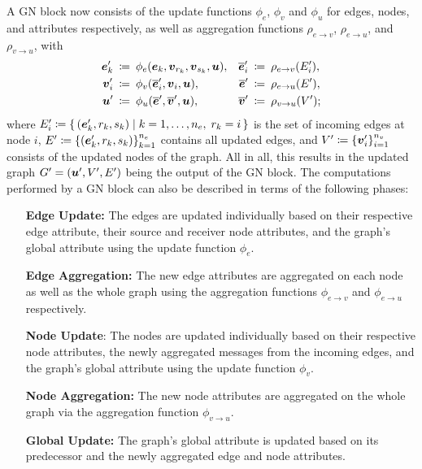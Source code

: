 A GN block now consists of the update functions $\phi_e$, $\phi_v$ and $\phi_u$ for edges,
nodes, and attributes respectively, as well as aggregation functions $\rho_{e \to v}$,
$\rho_{e \to u}$, and $\rho_{v \to u}$, with
\begin{align*}
    \boldsymbol{e}_k' \: &\coloneqq \: \phi_e(\boldsymbol{e}_k, \boldsymbol{v}_{r_k}, \boldsymbol{v}_{s_k}, \boldsymbol{u}), 
    &\overline{\boldsymbol{e}}'_i \: &\coloneqq \: \rho_{e \to v}(E_i'), \\
    \boldsymbol{v}_i' \: &\coloneqq \: \phi_v(\overline{\boldsymbol{e}}'_i, \boldsymbol{v}_i, \boldsymbol{u}), 
    &\overline{\boldsymbol{e}}' \: &\coloneqq \: \rho_{e \to u}(E'), \\
    \boldsymbol{u}' \: &\coloneqq \: \phi_u(\overline{\boldsymbol{e}}', \overline{\boldsymbol{v}}', \boldsymbol{u}),
    &\overline{\boldsymbol{v}}' \: &\coloneqq \: \rho_{v \to u}(V');
\end{align*}
where $E_i' \coloneqq \left\{\, (\boldsymbol{e}_k', r_k, s_k) \; \middle| \; k = 1, \dots, n_e, \; r_k = i \,\right\}$
is the set of incoming edges at node $i$, $E' \coloneqq \left\{(\boldsymbol{e}_k', r_k, s_k)\right\}_{k=1}^{n_e}$
contains all updated edges, and $V' \coloneqq \left\{\boldsymbol{v}_i'\right\}_{i=1}^{n_v}$ consists
of the updated nodes of the graph. All in all, this results in the updated graph 
$G' = (\boldsymbol{u}', V', E')$ being the output of the GN block.
The computations performed by a GN block can also be described in terms of the following phases:

\begin{enumerate}[align=left]
    \item[\textbf{Edge Update:}] The edges are updated individually based on their respective edge attribute, 
    their source and receiver node attributes, and the graph's global attribute using the
    update function $\phi_e$.
    \item[\textbf{Edge Aggregation:}] The new edge attributes are aggregated on each node
    as well as the whole graph using the aggregation functions $\phi_{e \to v}$ and
    $\phi_{e \to u}$ respectively.
    \item[\textbf{Node Update}:] The nodes are updated individually based on their respective
    node attributes, the newly aggregated messages from the incoming edges, and the graph's
    global attribute using the update function $\phi_v$.
    \item[\textbf{Node Aggregation:}] The new node attributes are aggregated on the whole
    graph via the aggregation function $\phi_{v \to u}$.
    \item[\textbf{Global Update:}] The graph's global attribute is updated based on its
    predecessor and the newly aggregated edge and node attributes.
\end{enumerate}

